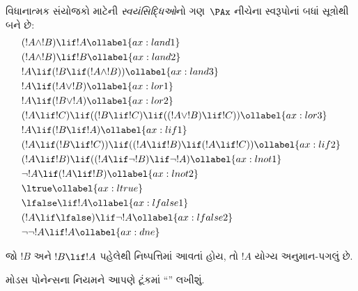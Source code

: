 \begingroup
\makeatletter{}\makeatother


\label{guunit:OLP-0114}


\begin{defn}[સ્વયંસિદ્ધિઓ]
વિધાનાત્મક સંયોજકો માટેની \emph{સ્વયંસિદ્ધિઓ}નો ગણ~$\PAx$ નીચેના
સ્વરૂપોનાં બધાં સૂત્રોથી બને છે:
\begin{align}
  & (!A \land !B) \lif !A \ollabel{ax:land1}\\
  & (!A \land !B) \lif !B \ollabel{ax:land2}\\
  & !A \lif (!B \lif (!A \land !B)) \ollabel{ax:land3}\\
  & !A \lif (!A \lor !B) \ollabel{ax:lor1}\\
  & !A \lif (!B \lor !A) \ollabel{ax:lor2}\\
  & (!A \lif !C) \lif ((!B \lif !C) \lif ((!A \lor !B) \lif !C)) \ollabel{ax:lor3}\\
  & !A \lif (!B \lif !A) \ollabel{ax:lif1}\\
  & (!A \lif (!B \lif !C)) \lif ((!A \lif !B) \lif (!A \lif !C)) \ollabel{ax:lif2}\\
  & (!A \lif !B) \lif ((!A \lif \lnot !B) \lif \lnot !A) \ollabel{ax:lnot1}\\
  & \lnot !A \lif (!A \lif !B) \ollabel{ax:lnot2}\\
  & \ltrue \ollabel{ax:ltrue}\\
  & \lfalse \lif !A \ollabel{ax:lfalse1}\\
  & (!A \lif \lfalse) \lif \lnot !A \ollabel{ax:lfalse2}\\
  & \lnot\lnot !A \lif !A \ollabel{ax:dne}
\end{align}
\end{defn}


\begin{defn}[મોડસ પોનેન્સ]
  જો $!B$ અને $!B \lif !A$ પહેલેથી નિષ્પત્તિમાં આવતાં હોય, તો
  $!A$ યોગ્ય અનુમાન-પગલું છે.
\end{defn}

મોડસ પોનેન્સના નિયમને આપણે ટૂંકમાં ``\MP'' લખીશું.
\endgroup


